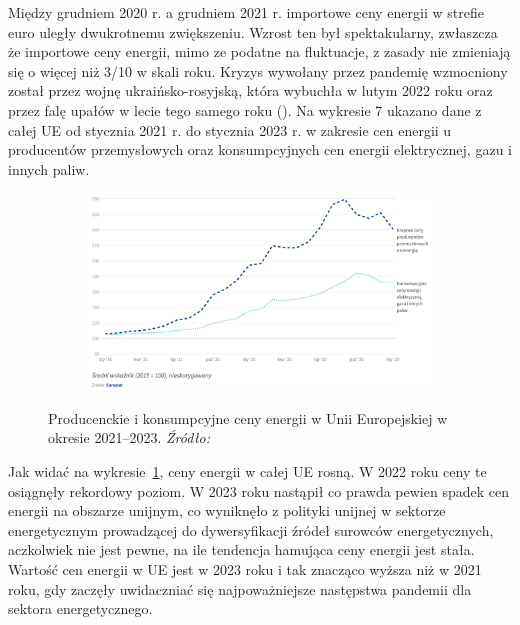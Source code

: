 \documentclass[polish, twoside, 12pt, a4paper]{article}
\theoremstyle{definition}
\theoremstyle{plain}
\theoremstyle{remark}
\begin{document}
Między grudniem 2020 r. a grudniem 2021 r. importowe ceny energii w strefie euro uległy dwukrotnemu zwiększeniu. Wzrost ten był spektakularny, zwłaszcza że importowe ceny energii, mimo ze podatne na fluktuacje, z zasady nie zmieniają się o więcej niż 3/10 w skali roku. Kryzys wywołany przez pandemię wzmocniony został przez wojnę ukraińsko-rosyjską, która wybuchła w lutym 2022 roku oraz przez falę upałów w lecie tego samego roku (\cite{council2023}). Na wykresie 7 ukazano dane z całej UE od stycznia 2021 r. do stycznia 2023 r. w zakresie cen energii u producentów przemysłowych oraz konsumpcyjnych cen energii elektrycznej, gazu i innych paliw.


\begin{figure}[hbt]
  \centering

  \begin{subfigure}[t]{0.45\textwidth}
    \hspace{-1.5cm}
    \includegraphics[width=1.4\textwidth]{./out_figures/figure_9}
  \end{subfigure}

  \captionsetup{margin=10pt,font=small,labelfont=bf,width=.8\textwidth}

  \caption[Producenckie i konsumpcyjne ceny energii w Unii Europejskiej w okresie 2021--2023]{Producenckie i konsumpcyjne ceny energii w Unii Europejskiej w okresie 2021--2023. \textit{Źródło:} \cite{council2023}}\label{fig:x9}
\end{figure}

Jak widać na wykresie~\ref{fig:x9}, ceny energii w całej UE rosną. W 2022 roku ceny te osiągnęły rekordowy poziom. W 2023 roku nastąpił co prawda pewien spadek cen energii na obszarze unijnym, co wyniknęło z polityki unijnej w sektorze energetycznym prowadzącej do dywersyfikacji źródeł surowców energetycznych, aczkolwiek nie jest pewne, na ile tendencja hamująca ceny energii jest stała. Wartość cen energii w UE jest w 2023 roku i tak znacząco wyższa niż w 2021 roku, gdy zaczęły uwidaczniać się najpoważniejsze następstwa pandemii dla sektora energetycznego. 
\end{document}
